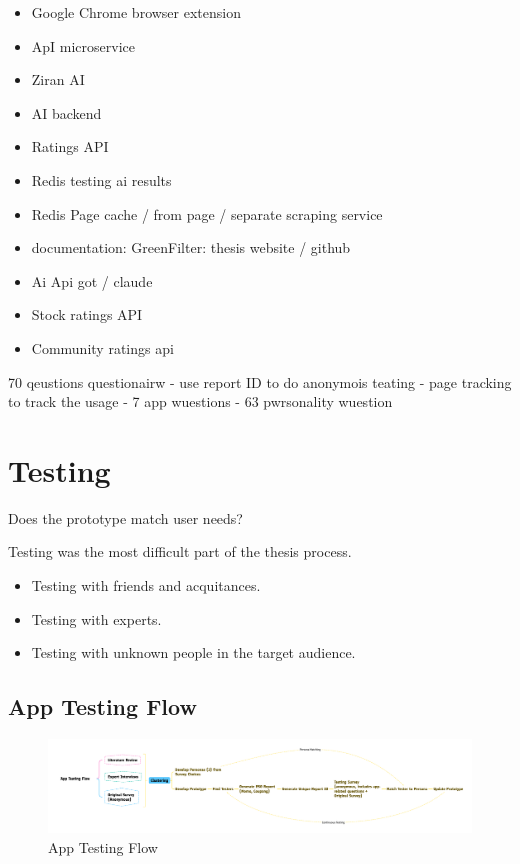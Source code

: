 \documentclass[
  letterpaper,
  DIV=11,
  numbers=noendperiod]{scrartcl}
\begin{document}
\begin{itemize}
\item
  Google Chrome browser extension
\item
  ApI microservice
\item
  Ziran AI
\item
  AI backend
\item
  Ratings API
\item
  Redis testing ai results
\item
  Redis Page cache / from page / separate scraping service
\item
  documentation: GreenFilter: thesis website / github
\item
  Ai Api got / claude
\item
  Stock ratings API
\item
  Community ratings api
\end{itemize}

70 qeustions questionairw - use report ID to do anonymois teating - page
tracking to track the usage - 7 app wuestions - 63 pwrsonality wuestion

\newpage

\section{Testing}\label{testing-1}

Does the prototype match user needs?

Testing was the most difficult part of the thesis process.

\begin{itemize}
\item
  Testing with friends and acquitances.
\item
  Testing with experts.
\item
  Testing with unknown people in the target audience.
\end{itemize}

\subsection{App Testing Flow}\label{app-testing-flow}

\begin{figure}[H]

{\centering \includegraphics[width=1\linewidth,height=\textheight,keepaspectratio]{./images/testing/app-testing-flow.png}

}

\caption{App Testing Flow}

\end{figure}%
\end{document}
